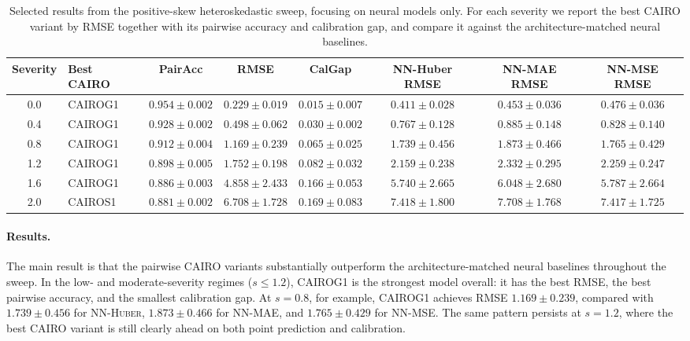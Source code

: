 \begin{table}[t]
\centering
\small
\caption{Selected results from the positive-skew heteroskedastic sweep, focusing on neural models only. For each severity we report the best CAIRO variant by RMSE together with its pairwise accuracy and calibration gap, and compare it against the architecture-matched neural baselines.}
\label{tab:positive-skew-neural}
\begin{tabular}{c l c c c c c c}
\toprule
Severity & Best CAIRO & PairAcc & RMSE & CalGap & NN-Huber RMSE & NN-MAE RMSE & NN-MSE RMSE \\
\midrule
0.0 & \textsc{CAIROG1} & $0.954 \pm 0.002$ & $0.229 \pm 0.019$ & $0.015 \pm 0.007$ & $0.411 \pm 0.028$ & $0.453 \pm 0.036$ & $0.476 \pm 0.036$ \\
0.4 & \textsc{CAIROG1} & $0.928 \pm 0.002$ & $0.498 \pm 0.062$ & $0.030 \pm 0.002$ & $0.767 \pm 0.128$ & $0.885 \pm 0.148$ & $0.828 \pm 0.140$ \\
0.8 & \textsc{CAIROG1} & $0.912 \pm 0.004$ & $1.169 \pm 0.239$ & $0.065 \pm 0.025$ & $1.739 \pm 0.456$ & $1.873 \pm 0.466$ & $1.765 \pm 0.429$ \\
1.2 & \textsc{CAIROG1} & $0.898 \pm 0.005$ & $1.752 \pm 0.198$ & $0.082 \pm 0.032$ & $2.159 \pm 0.238$ & $2.332 \pm 0.295$ & $2.259 \pm 0.247$ \\
1.6 & \textsc{CAIROG1} & $0.886 \pm 0.003$ & $4.858 \pm 2.433$ & $0.166 \pm 0.053$ & $5.740 \pm 2.665$ & $6.048 \pm 2.680$ & $5.787 \pm 2.664$ \\
2.0 & \textsc{CAIROS1} & $0.881 \pm 0.002$ & $6.708 \pm 1.728$ & $0.169 \pm 0.083$ & $7.418 \pm 1.800$ & $7.708 \pm 1.768$ & $7.417 \pm 1.725$ \\
\bottomrule
\end{tabular}
\end{table}

\paragraph{Results.}
The main result is that the pairwise CAIRO variants substantially outperform the architecture-matched neural baselines throughout the sweep. In the low- and moderate-severity regimes (\(s \le 1.2\)), \textsc{CAIROG1} is the strongest model overall: it has the best RMSE, the best pairwise accuracy, and the smallest calibration gap. At \(s=0.8\), for example, \textsc{CAIROG1} achieves RMSE \(1.169 \pm 0.239\), compared with \(1.739 \pm 0.456\) for \textsc{NN-Huber}, \(1.873 \pm 0.466\) for \textsc{NN-MAE}, and \(1.765 \pm 0.429\) for \textsc{NN-MSE}. The same pattern persists at \(s=1.2\), where the best CAIRO variant is still clearly ahead on both point prediction and calibration.


